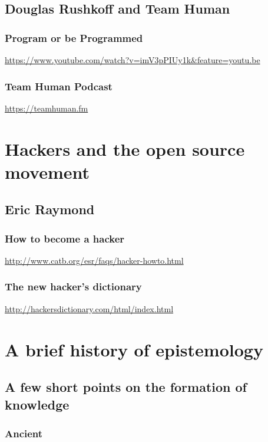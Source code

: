 \documentclass[11pt]{article}
\begin{document}
\subsection{Douglas Rushkoff and Team Human}
\label{sec:org4f2ce15}
\subsubsection{Program or be Programmed}
\label{sec:org005c159}
\url{https://www.youtube.com/watch?v=imV3pPIUy1k\&feature=youtu.be}

\subsubsection{Team Human Podcast}
\label{sec:orge0c4541}
\url{https://teamhuman.fm}



\section{Hackers and the open source movement}
\label{sec:org4823fe3}
\subsection{Eric Raymond}
\label{sec:org7198911}
\subsubsection{How to become a hacker}
\label{sec:org96d588f}
\url{http://www.catb.org/esr/faqs/hacker-howto.html}
\subsubsection{The new hacker's dictionary}
\label{sec:org5af8336}
\url{http://hackersdictionary.com/html/index.html}


\section{A brief history of epistemology}
\label{sec:org162b5f0}
\subsection{A few short points on the formation of knowledge}
\label{sec:org6ae346c}
\subsubsection{Ancient}
\label{sec:org1b5fbb0}
\end{document}
